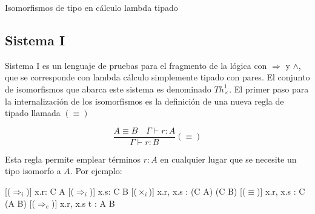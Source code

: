 \documentclass[]{report}
\begin{document}
\begin{table}[H]
\begin{minipage}{0.7\linewidth}
		\end{minipage}
		\caption{Isomorfismos de tipo en cálculo lambda tipado}
	\end{table}
	
	\subsection{Sistema I}
	Sistema I \cite{system-i} es un lenguaje de pruebas para el fragmento de la lógica con $\Rightarrow$ y $\wedge$, que se corresponde con lambda cálculo simplemente tipado con pares.
	El conjunto de isomorfismos que abarca este sistema es denominado $Th^1_\times$.
	El primer paso para la internalización de los isomorfismos es la definición de una nueva regla de tipado llamada $(\equiv)$
	
	\[ \frac{A \equiv B \quad \Gamma \vdash r:A}{\Gamma \vdash r:B} (\equiv) \]
	
	Esta regla permite emplear términos $r:A$ en cualquier lugar que se necesite un tipo isomorfo a $A$. Por ejemplo:
	
	\begin{prooftree*}
		[($\Rightarrow_i$)]{ \Gamma\vdash \lambda x.r: C \Rightarrow A }
		[($\Rightarrow_i$)]{ \Gamma\vdash \lambda x.s: C \Rightarrow B }
		[($\times_i$)]{ \Gamma\vdash \langle \lambda x.r, \lambda x.s \rangle : (C \Rightarrow A) \times (C \Rightarrow B) }
		[($\equiv$)]{ \Gamma\vdash \langle \lambda x.r, \lambda x.s \rangle : C \Rightarrow (A \times B) }
		[($\Rightarrow_e$)]{ \Gamma\vdash \langle \lambda x.r, \lambda x.s \rangle \; t : A \times B }
	\end{prooftree*}
	
\end{document}
